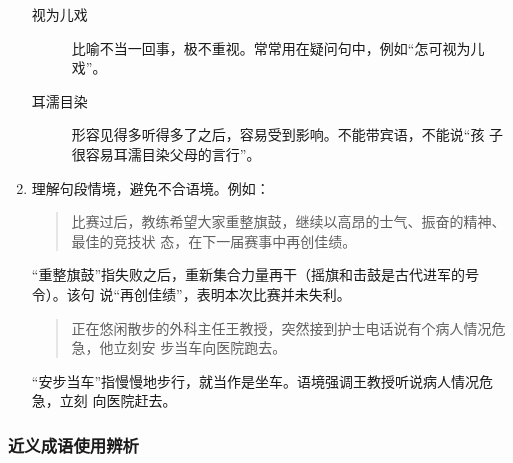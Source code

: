 \documentclass[final,oneside]{ctexbook}
\newenvironment{equotation}{\begin{quotation}\kaishu}{\end{quotation}}
\begin{document}
\begin{enumerate}
\begin{description}
      \item[视为儿戏] 比喻不当一回事，极不重视。常常用在疑问句中，例如“怎可视为儿
        戏”。

      \item[耳濡目染] 形容见得多听得多了之后，容易受到影响。不能带宾语，不能说“孩
        子很容易耳濡目染父母的言行”。

    \end{description}

  \item 理解句段情境，避免不合语境。例如：
    \begin{equotation}
      比赛过后，教练希望大家重整旗鼓，继续以高昂的士气、振奋的精神、最佳的竞技状
      态，在下一届赛事中再创佳绩。
    \end{equotation}
    “重整旗鼓”指失败之后，重新集合力量再干（摇旗和击鼓是古代进军的号令）。该句
    说“再创佳绩”，表明本次比赛并未失利。
    \begin{equotation}
      正在悠闲散步的外科主任王教授，突然接到护士电话说有个病人情况危急，他立刻安
      步当车向医院跑去。
    \end{equotation}
    “安步当车”指慢慢地步行，就当作是坐车。语境强调王教授听说病人情况危急，立刻
    向医院赶去。

\end{enumerate}

\subsubsection{近义成语使用辨析}
\end{document}

